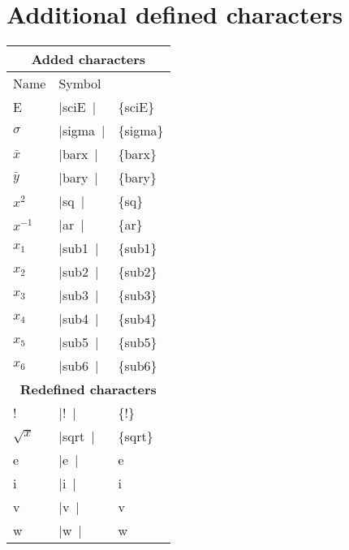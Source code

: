 \documentclass[a4paper,12pt]{article}
\newcommand{\LCDsymb}[1]{\large \textLCD{1}|{#1}~|}
\newcommand{\LCDcmd}{\textbackslash\texttt{LCD}\xspace}
\begin{document}
\section{Additional defined characters} 
\begin{tabular}{l|l|>{\ttfamily}l}
	\hline
	\multicolumn{3}{c}{\textbf{Added characters}} \\
	\hline \hline
	Name		& Symbol		&\normalfont{\LCDcmd Code} \\
	\hline
	E		& \LCDsymb{sciE}	& \{sciE\} \\
	$\sigma$	& \LCDsymb{sigma}	& \{sigma\} \\
	$\bar x$	& \LCDsymb{barx}	& \{barx\} \\
	$\bar y$	& \LCDsymb{bary}	& \{bary\} \\
	$x^2$		& \LCDsymb{sq}		& \{sq\} \\
	$x^{-1}$	& \LCDsymb{ar}		& \{ar\} \\
	$x_1$		& \LCDsymb{sub1}	& \{sub1\} \\
	$x_2$		& \LCDsymb{sub2}	& \{sub2\} \\
	$x_3$		& \LCDsymb{sub3}	& \{sub3\} \\
	$x_4$		& \LCDsymb{sub4}	& \{sub4\} \\
	$x_5$		& \LCDsymb{sub5}	& \{sub5\} \\
	$x_6$		& \LCDsymb{sub6}	& \{sub6\} \\
	\hline
	\multicolumn{3}{c}{\textbf{Redefined characters}} \\
	\hline \hline
	!		& \LCDsymb{!}		& \{!\} \\
	$\sqrt{x}$	& \LCDsymb{sqrt}	& \{sqrt\} \\
	e		& \LCDsymb{e}		& e \\
	i		& \LCDsymb{i}		& i \\
	v		& \LCDsymb{v}		& v \\
	w		& \LCDsymb{w}		& w \\
\end{tabular}
\end{document}
